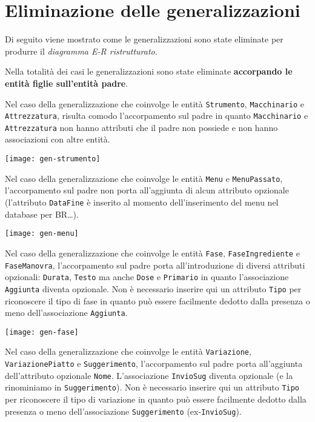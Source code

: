 \section{Eliminazione delle generalizzazioni}\label{sec:generalizations}
Di seguito viene mostrato come le generalizzazioni sono state eliminate per produrre
il {\it diagramma E-R ristrutturato}.

Nella totalità dei casi le generalizzazioni sono state eliminate {\bf accorpando
le entità figlie sull'entità padre}.

\vspace{15pt}

Nel caso della generalizzazione che coinvolge le entità {\tt Strumento}, {\tt Macchinario}
e {\tt Attrezzatura}, risulta comodo l'accorpamento sul padre in quanto {\tt Macchinario}
e {\tt Attrezzatura} non hanno attributi che il padre non possiede e non hanno
associazioni con altre entità.

\vspace{5pt}\centerline{\texttt{[image: gen-strumento]}}

\vspace{15pt}

Nel caso della generalizzazione che coinvolge le entità {\tt Menu} e  {\tt MenuPassato},
l'accorpamento sul padre non porta all'aggiunta di alcun attributo opzionale (l'attributo
{\tt DataFine} è inserito al momento dell'inserimento del menu nel database per BR\ldots).

\vspace{5pt}\centerline{\texttt{[image: gen-menu]}}

\vspace{15pt}

Nel caso della generalizzazione che coinvolge le entità {\tt Fase}, {\tt FaseIngrediente}
e {\tt FaseManovra}, l'accorpamento sul padre porta all'introduzione di diversi attributi
opzionali: {\tt Durata}, {\tt Testo} ma anche {\tt Dose} e {\tt Primario} in quanto l'associazione
{\tt Aggiunta} diventa opzionale. Non è necessario inserire qui un attributo {\tt Tipo} per
riconoscere il tipo di fase in quanto può essere facilmente dedotto dalla presenza o meno
dell'associazione {\tt Aggiunta}.

\vspace{5pt}\centerline{\texttt{[image: gen-fase]}}

\vspace{15pt}

Nel caso della generalizzazione che coinvolge le entità {\tt Variazione}, {\tt VariazionePiatto}
e {\tt Suggerimento}, l'accorpamento sul padre porta all'aggiunta dell'attributo opzionale
{\tt Nome}. L'associazione {\tt InvioSug} diventa opzionale (e la rinominiamo in {\tt Suggerimento}).
Non è necessario inserire qui un attributo {\tt Tipo} per riconoscere il tipo di variazione
in quanto può essere facilmente dedotto dalla presenza o meno dell'associazione {\tt Suggerimento} (\hbox{ex-\texttt{InvioSug}}).

